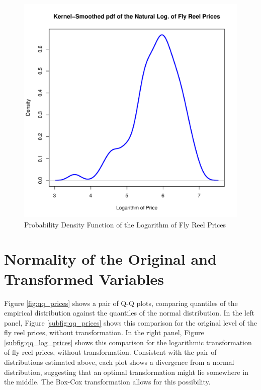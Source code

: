 \begin{figure}[h!]
  \centering
  \includegraphics[scale = 0.5, keepaspectratio=true]{../Figures/density_log_prices}
  \caption{Probability Density Function of the Logarithm of Fly Reel Prices} \label{fig:density_log_prices}
\end{figure}




\pagebreak
\section{Normality of the Original and Transformed Variables}

Figure \ref{fig:qq_prices} shows a pair of Q-Q plots, 
comparing quantiles of the empirical distribution against
the quantiles of the normal distribution. 
In the left panel, Figure \ref{subfig:qq_prices} shows this comparison 
for the original level of the fly reel prices, without transformation. 
In the right panel, Figure \ref{subfig:qq_log_prices} shows this comparison 
for the logarithmic transformation of fly reel prices, without transformation. 
Consistent with the pair of distributions estimated above, 
each plot shows a divergence from a normal distribution,
suggesting that an optimal transformation might lie somewhere in the middle.
The Box-Cox transformation allows for this possibility. 

